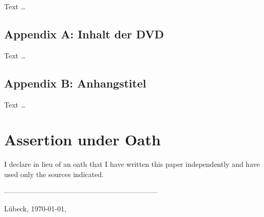 Text \dots

{}
\section*{Appendix A: Inhalt der DVD}
\begin{comment}
Oft ein Default: Was findet man auf der beiliegenden DVD in welchem Verzeichnis? Max. 1 Seite.

\textbf{In jedem Fall} die PDF der Arbeit, den Programmcode, Daten (anonymisiert!).

\textbf{Niemals} Interviewaufzeichnungen, Einverständniserklärungen oder ähnliche personenbezogene Daten auf die DVD brennen — Sie haben in den meisten Fällen Anonymität zugesichert und die DVD ist frei zugänglich (ein Exemplar der Arbeit kommt in die Bibliothek). 
\end{comment}

Text \dots

{}
\section*{Appendix B: Anhangstitel}
\begin{comment}
Weitere Inhalte je nachdem, wo der Leser ohne großen Aufwand hinspringen sollte.
\end{comment}

Text \dots

\clearpage

{}
\chapter*{Assertion under Oath}
I declare in lieu of an oath that I have written this paper independently and have used only the sources indicated.

\begin{comment}
[Nach Ausdruck unterschreiben. Muss auf Papier sein.]
\end{comment}

-----------------------------------------------------------------

Lübeck, \today, \authorMA
